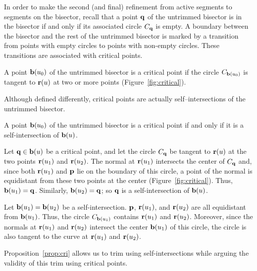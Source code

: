 In order to make the second (and final) refinement from active segments
to segments on the bisector,
recall that a point ${\bf q}$ of the untrimmed bisector is in the bisector
if and only if its associated circle $C_{\bf q}$ is empty.
A boundary between the bisector and the rest of the untrimmed bisector
is marked by a transition from points with empty circles to points
with non-empty circles.
These transitions are associated with critical points.

\begin{dfn}
\label{d:cri}
A point ${\bf b}(u_{0})$ of the untrimmed bisector is a {\rm critical} point
if the circle $C_{{\bf b}(u_0)}$
is tangent to ${\bf r}(u)$ at two or more points (Figure~\ref{fig:critical}).
\end{dfn}


Although defined differently, critical points are actually self--intersections
of the untrimmed bisector.

\begin{propn}
\label{prop:cri}
A point ${\bf b}(u_0)$ of the untrimmed bisector is a
critical point if and only if it is a self-intersection of ${\bf b}(u)$.
\end{propn}

\prf Let ${\bf q} \in {\bf b}(u)$ be a critical point, and let
the circle $C_{\bf q}$
be tangent to ${\bf r}(u)$ at the two points ${\bf r}(u_1)$ and ${\bf r}(u_2)$.
The normal at ${\bf r}(u_1)$ intersects the center of
$C_{\bf q}$ and, since both ${\bf r}(u_1)$
and ${\bf p}$ lie on the boundary of this circle, a point of
the normal is equidistant
from these two points at the center (Figure~\ref{fig:critical}).
Thus, ${\bf b}(u_{1}) = {\bf q}$.
Similarly, ${\bf b}(u_{2}) = {\bf q}$; so ${\bf q}$ is a self-intersection
of ${\bf b}(u)$.

Let ${\bf b}(u_{1}) = {\bf b}(u_{2})$ be a self-intersection.
${\bf p}$, ${\bf r}(u_{1})$, and ${\bf r}(u_{2})$ are all equidistant from
${\bf b}(u_{1})$.
Thus, the circle $C_{{\bf b}(u_{1})}$
contains ${\bf r}(u_{1})$ and ${\bf r}(u_{2})$.
Moreover, since the normals at ${\bf r}(u_{1})$ and ${\bf r}(u_{2})$
intersect the center ${\bf b}(u_{1})$ of this circle,
the circle is also tangent to the curve at
${\bf r}(u_{1})$ and ${\bf r}(u_{2})$.
\QED

Proposition~\ref{prop:cri} allows us to trim using self-intersections
while arguing the validity of this trim using critical points.

